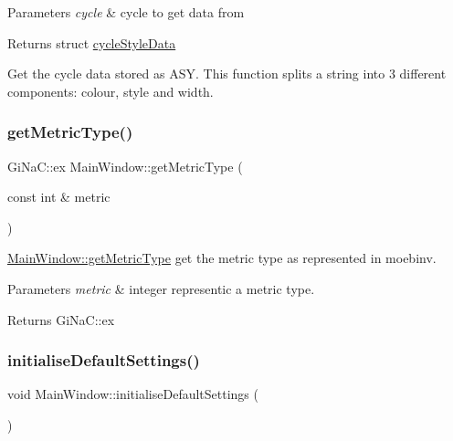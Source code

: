\begin{DoxyParams}{Parameters}
{\em cycle} & cycle to get data from \\
\hline
\end{DoxyParams}
\begin{DoxyReturn}{Returns}
struct \mbox{\hyperlink{structcycle_style_data}{cycle\+Style\+Data}}
\end{DoxyReturn}
Get the cycle data stored as A\+SY. This function splits a string into 3 different components\+: colour, style and width. \mbox{\label{class_main_window_afa9a4efe6ebf3ab77ec807346d792732}} 
\subsubsection{\texorpdfstring{get\+Metric\+Type()}{getMetricType()}}
{\footnotesize\ttfamily Gi\+Na\+C\+::ex Main\+Window\+::get\+Metric\+Type (\begin{DoxyParamCaption}\item[{const int \&}]{metric }\end{DoxyParamCaption})}



\mbox{\hyperlink{class_main_window_afa9a4efe6ebf3ab77ec807346d792732}{Main\+Window\+::get\+Metric\+Type}} get the metric type as represented in moebinv. 


\begin{DoxyParams}{Parameters}
{\em metric} & integer representic a metric type. \\
\hline
\end{DoxyParams}
\begin{DoxyReturn}{Returns}
Gi\+Na\+C\+::ex 
\end{DoxyReturn}
\mbox{\label{class_main_window_a72e9fc361f05240f439fb17ff78a40cc}} 
\subsubsection{\texorpdfstring{initialise\+Default\+Settings()}{initialiseDefaultSettings()}}
{\footnotesize\ttfamily void Main\+Window\+::initialise\+Default\+Settings (\begin{DoxyParamCaption}{ }\end{DoxyParamCaption})}



